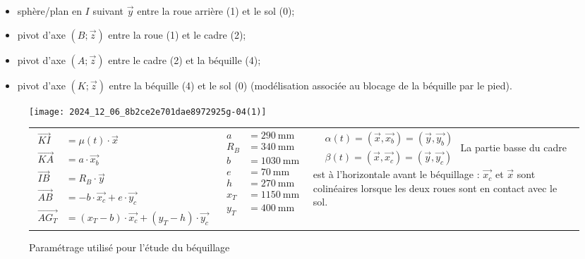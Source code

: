 \begin{itemize}
  \item sphère/plan en \(I\) suivant \(\vec{y}\) entre la roue arrière (1) et le sol (0);
  \item pivot d'axe \(( B ; \vec{z})\)  entre la roue (1) et le cadre (2);
  \item pivot d'axe \((A ; \vec{z})\) entre le cadre (2) et la béquille (4);
  \item pivot d'axe \((K ; \vec{z})\) entre la béquille (4) et le sol (0) (modélisation associée au blocage de la béquille par le pied).
\end{itemize}

\begin{figure}[!htb]
\centering

\texttt{[image: 2024\_12\_06\_8b2ce2e701dae8972925g-04(1)]}

\begin{tabular}{p{5cm}p{5cm}p{5cm}}
$
\begin{aligned}
\overrightarrow{K I} & =\mu(t) \cdot \vec{x} \\
\overrightarrow{K A} & =a \cdot \overrightarrow{x_{b}} \\
\overrightarrow{I B} & =R_{B} \cdot \vec{y} \\
\overrightarrow{A B} & =-b \cdot \overrightarrow{x_{c}}+e \cdot \overrightarrow{y_{c}} \\
\overrightarrow{A G_{T}} & =\left(x_{T}-b\right) \cdot \overrightarrow{x_{c}}+\left(y_{T}-h\right) \cdot \overrightarrow{y_{c}}
\end{aligned}
$
&
$
\begin{aligned}
a & =290 \mathrm{~mm} \\
R_{B} & =340 \mathrm{~mm} \\
b & =1030 \mathrm{~mm} \\
e & =70 \mathrm{~mm} \\
h & =270 \mathrm{~mm} \\
x_{T} & =1150 \mathrm{~mm} \\
y_{T} & =400 \mathrm{~mm}
\end{aligned}
$
&
$
\begin{aligned}
& \alpha(t)=\left(\vec{x}, \overrightarrow{x_{b}}\right)=\left(\vec{y}, \overrightarrow{y_{b}}\right) \\
& \beta(t)=\left(\vec{x}, \overrightarrow{x_{c}}\right)=\left(\vec{y}, \overrightarrow{y_{c}}\right)
\end{aligned}
$
La partie basse du cadre est à l'horizontale avant le béquillage : \(\overrightarrow{x_{c}}\) et \(\vec{x}\) sont colinéaires lorsque les deux roues sont en contact avec le sol.
\\
\end{tabular}
\caption{\label{fig_23} Paramétrage utilisé pour l'étude du béquillage}

\end{figure}
\fi


